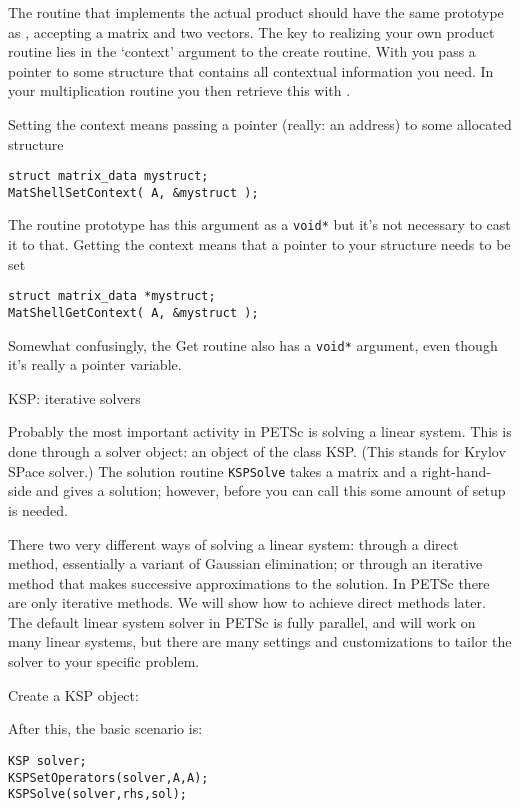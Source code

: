 The routine that implements the actual product should have the same
prototype as , accepting a matrix and two
vectors. The key to realizing your own product routine lies in the
`context' argument to the create routine. With
 you pass a pointer to some
structure that contains all contextual information you need. In your
multiplication routine you then retrieve this with .

Setting the context means passing a pointer (really: an address) to
some allocated structure
\begin{lstlisting}
struct matrix_data mystruct;
MatShellSetContext( A, &mystruct );
\end{lstlisting}

The routine prototype
has this argument as a \lstinline{void*} but it's not necessary to
cast it to that. Getting the context means that a pointer to your
structure needs to be set
\begin{lstlisting}
struct matrix_data *mystruct;
MatShellGetContext( A, &mystruct );
\end{lstlisting}
Somewhat confusingly, the Get routine also has a \lstinline{void*}
argument, even though it's really a pointer variable.

 {KSP: iterative solvers}
\label{sec:petsc-ksp}

Probably the most important activity in PETSc is solving a linear
system. This is done through a solver object: an object of the class
KSP. (This stands for Krylov SPace solver.) The solution routine
\lstinline{KSPSolve} takes a matrix and a right-hand-side and gives a
solution; however, before you can call this some amount of setup is needed.

There two very different ways of solving a
linear system: through a direct method, essentially a variant of
Gaussian elimination; or through an iterative method that makes
successive approximations to the solution. In PETSc there are only
iterative methods. We will show how to achieve direct methods later.
The default linear system solver in PETSc is fully parallel, and will
work on many linear systems, but there are many settings and
customizations to tailor the solver to your specific problem.

Create a KSP object:
%

After this, the basic scenario is:
\begin{lstlisting}
KSP solver;
KSPSetOperators(solver,A,A);
KSPSolve(solver,rhs,sol);
\end{lstlisting}

